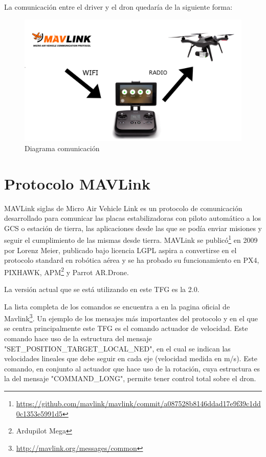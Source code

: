 La comunicación entre el driver y el dron quedaría de la siguiente forma:

\begin{figure}[H]
  \centering
  \includegraphics[scale=0.15]{imagenes/diagramaComunicacion.jpg}
  \caption{Diagrama comunicación}
  \label{fig:diagrama}
\end{figure}

\section{Protocolo MAVLink}
\label{sec:mavlink}

MAVLink siglas de Micro Air Vehicle Link es un protocolo de comunicación desarrollado para comunicar las placas estabilizadoras con piloto automático a los GCS o estación de tierra, las aplicaciones desde las que se podía enviar misiones y seguir el cumplimiento de las mismas desde tierra.
MAVLink se publicó\footnote{\url{https://github.com/mavlink/mavlink/commit/a087528b8146ddad17e9f39c1dd0c1353e5991d5}} en 2009 por Lorenz Meier, publicado bajo licencia LGPL aspira a convertirse en el protocolo standard en robótica aérea y se ha probado su funcionamiento en PX4, PIXHAWK, APM\footnote{Ardupilot Mega} y Parrot AR.Drone.

La versión actual que se está utilizando en este TFG es la 2.0.


La lista completa de los comandos se encuentra a en la pagina oficial de Mavlink\footnote{\url{http://mavlink.org/messages/common}}. Un ejemplo de los mensajes más importantes del protocolo y en el que se centra principalmente este TFG es el comando actuador de velocidad. Este comando hace uso de la estructura del mensaje "SET\_POSITION\_TARGET\_LOCAL\_NED", en el cual se indican las velocidades lineales que debe seguir en cada eje (velocidad medida en m/s). Este comando, en conjunto al actuador que hace uso de la rotación, cuya estructura es la del mensaje "COMMAND\_LONG", permite tener control total sobre el dron. 

